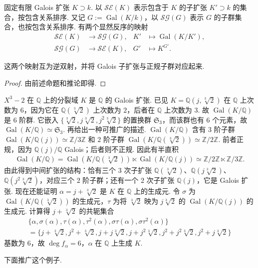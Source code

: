固定有限 Galois 扩张 $K\supset k$. 以 $\mathcal{SE}(K)$ 表示包含于 $K$ 的子扩张 $K'\supset k$ 的集合，按包含关系排序. 又记 $G:=\operatorname{Gal}(K/k)$，以 $\mathcal{SG}(G)$ 表示 $G$ 的子群集合，也按包含关系排序. 有两个显然反序的映射
\begin{align*}
\mathcal{SE}(K)&\longrightarrow\mathcal{SG}(G),& K'&\longmapsto\operatorname{Gal}(K/K'),\\
\mathcal{SG}(G)&\longrightarrow\mathcal{SE}(K),& G'&\longmapsto K^{G'}.
\end{align*}
\begin{theorem*}这两个映射互为逆双射，并将 Galois 子扩张与正规子群对应起来.\end{theorem*}
\begin{proof}由前述命题和推论即得.\end{proof}

\begin{example*}$X^3-2$ 在 $\mathbb Q$ 上的分裂域 $K$ 是 $\mathbb Q$ 的 Galois 扩张. 已见 $K=\mathbb Q(j,\sqrt[3]2)$ 在 $\mathbb Q$ 上次数为 $6$，因为它在 $\mathbb Q(\sqrt[3]2)$ 上次数为 $2$，后者在 $\mathbb Q$ 上次数为 $3$. 故 $\operatorname{Gal}(K/\mathbb Q)$ 是 $6$ 阶群. 它嵌入 $\{\sqrt[3]2,j\sqrt[3]2,j^2\sqrt[3]2\}$ 的置换群 $\mathfrak S_3$，而该群也有 $6$ 个元素，故 $\operatorname{Gal}(K/\mathbb Q)\simeq\mathfrak S_3$.
再给出一种可推广的描述. $\operatorname{Gal}(K/\mathbb Q)$ 含有 $3$ 阶子群 $\operatorname{Gal}(K/\mathbb Q(j))\simeq\mathbb Z/3\mathbb Z$ 和 $2$ 阶子群 $\operatorname{Gal}(K/\mathbb Q(\sqrt[3]2))\simeq\mathbb Z/2\mathbb Z$. 前者正规，因为 $\mathbb Q(j)/\mathbb Q$ Galois；后者则不正规. 因此有半直积
\begin{align*}
\operatorname{Gal}(K/\mathbb Q)=\operatorname{Gal}(K/\mathbb Q(\sqrt[3]2))\ltimes\operatorname{Gal}(K/\mathbb Q(j))\simeq\mathbb Z/2\mathbb Z\ltimes\mathbb Z/3\mathbb Z.
\end{align*}
由此得到中间扩张的结构：恰有三个 $3$ 次子扩张 $\mathbb Q(\sqrt[3]2)$、$\mathbb Q(j\sqrt[3]2)$、$\mathbb Q(j^2\sqrt[3]2)$，对应三个 $2$ 阶子群；还有一个 $2$ 次子扩张 $\mathbb Q(j)$，它是 Galois 扩张.
现在还能证明 $\alpha=j+\sqrt[3]2$ 是 $K$ 在 $\mathbb Q$ 上的生成元. 令 $\sigma$ 为 $\operatorname{Gal}(K/\mathbb Q(\sqrt[3]2))$ 的生成元，$\tau$ 为将 $\sqrt[3]2$ 映为 $j\sqrt[3]2$ 的 $\operatorname{Gal}(K/\mathbb Q(j))$ 的生成元. 计算得 $j+\sqrt[3]2$ 的共轭集合
\begin{align*}
\{\alpha,\sigma(\alpha),\tau(\alpha),\tau^2(\alpha),\sigma\tau(\alpha),\sigma\tau^2(\alpha)\}
\\=\bigl\{j+\sqrt[3]2,j^2+\sqrt[3]2,j+j\sqrt[3]2,j+j^2\sqrt[3]2,j^2+j^2\sqrt[3]2,j^2+j\sqrt[3]2\bigr\}
\end{align*}
基数为 $6$，故 $\deg f_\alpha=6$，$\alpha$ 在 $\mathbb Q$ 上生成 $K$.\end{example*}
下面推广这个例子.
